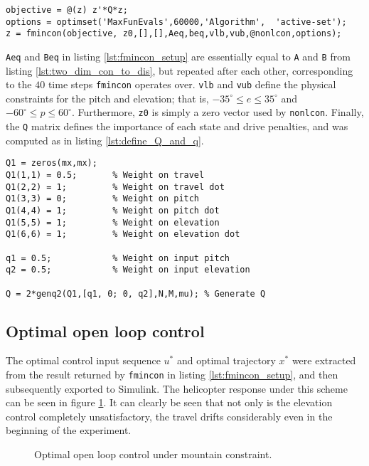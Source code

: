 \begin{lstlisting}[caption=Setup of \lstinline!fmincon! for objective function \ref{eq:two_dim_objective_function}.,label=lst:fmincon_setup]
%% Objective function
objective = @(z) z'*Q*z;
options = optimset('MaxFunEvals',60000,'Algorithm',  'active-set');
z = fmincon(objective, z0,[],[],Aeq,beq,vlb,vub,@nonlcon,options);
\end{lstlisting}
\lstinline!Aeq! and \lstinline!Beq! in listing \ref{lst:fmincon_setup} are essentially equal to \lstinline!A! and \lstinline!B! from listing \ref{lst:two_dim_con_to_dis}, but repeated after each other, corresponding to the $40$ time steps \lstinline!fmincon! operates over. \lstinline!vlb! and \lstinline!vub! define the physical constraints for the pitch and elevation; that is, $-35^\circ \leq e \leq 35^\circ$ and $-60^\circ \leq p \leq 60^\circ$. Furthermore, \lstinline!z0! is simply a zero vector used by \lstinline!nonlcon!. Finally, the \lstinline!Q! matrix defines the importance of each state and drive penalties, and was computed as in listing \ref{lst:define_Q_and_q}.
\begin{lstlisting}[caption=Definition of Q matrix and drive penalties.,label=lst:define_Q_and_q]
%% Generate the matrix Q
Q1 = zeros(mx,mx);
Q1(1,1) = 0.5;       % Weight on travel
Q1(2,2) = 1;         % Weight on travel dot
Q1(3,3) = 0;         % Weight on pitch
Q1(4,4) = 1;         % Weight on pitch dot
Q1(5,5) = 1;         % Weight on elevation
Q1(6,6) = 1;         % Weight on elevation dot

q1 = 0.5;            % Weight on input pitch
q2 = 0.5;            % Weight on input elevation

Q = 2*genq2(Q1,[q1, 0; 0, q2],N,M,mu); % Generate Q
\end{lstlisting}

\subsection{Optimal open loop control}
The optimal control input sequence $u^*$ and optimal trajectory $x^*$ were extracted from the result returned by \lstinline!fmincon! in listing \ref{lst:fmincon_setup}, and then subsequently exported to Simulink. The helicopter response under this scheme can be seen in figure \ref{fig:two_dim_open_loop}. It can clearly be seen that not only is the elevation control completely unsatisfactory, the travel drifts considerably even in the beginning of the experiment.
\begin{figure} 
        \centering
        \setlength{\figureheight}{6cm}
        \setlength{\figurewidth}{10cm}
        
        \caption{Optimal open loop control under mountain constraint.} 
\label{fig:two_dim_open_loop} 
\end{figure}
